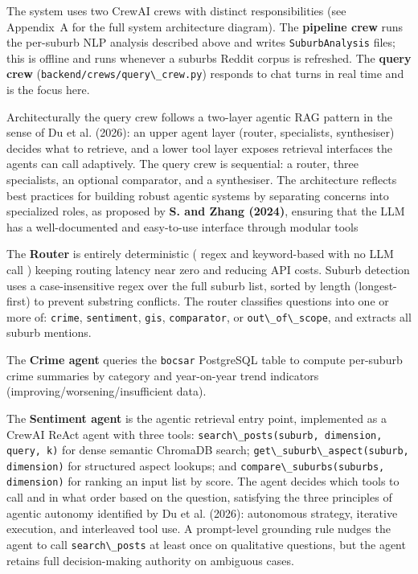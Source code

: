 \documentclass[11pt,a4paper]{article}
\newcommand{\passthrough}[1]{#1}
\begin{document}
The system uses two CrewAI crews with distinct responsibilities (see Appendix~A for the full system architecture diagram). The \textbf{pipeline crew} runs the per-suburb NLP analysis described above and writes \passthrough{\lstinline!SuburbAnalysis!} files; this is offline and runs whenever a suburb\textquotesingle s Reddit corpus is refreshed. The \textbf{query crew} (\passthrough{\lstinline!backend/crews/query\_crew.py!}) responds to chat turns in real time and is the focus here.

Architecturally the query crew follows a two-layer agentic RAG pattern in the sense of Du et al. (2026): an upper agent layer (router, specialists, synthesiser) decides what to retrieve, and a lower tool layer exposes retrieval interfaces the agents can call adaptively. The query crew is sequential: a router, three specialists, an optional comparator, and a synthesiser. The architecture reflects best practices for building robust agentic systems by separating concerns into specialized roles, as proposed by \textbf{S. and Zhang (2024)}, ensuring that the LLM has a well-documented and easy-to-use interface through modular tools

The \textbf{Router} is entirely deterministic ( regex and keyword-based with no LLM call ) keeping routing latency near zero and reducing API costs. Suburb detection uses a case-insensitive regex over the full suburb list, sorted by length (longest-first) to prevent substring conflicts. The router classifies questions into one or more of: \passthrough{\lstinline!crime!}, \passthrough{\lstinline!sentiment!}, \passthrough{\lstinline!gis!}, \passthrough{\lstinline!comparator!}, or \passthrough{\lstinline!out\_of\_scope!}, and extracts all suburb mentions.

The \textbf{Crime agent} queries the \passthrough{\lstinline!bocsar!} PostgreSQL table to compute per-suburb crime summaries by category and year-on-year trend indicators (improving/worsening/insufficient data).

The \textbf{Sentiment agent} is the agentic retrieval entry point, implemented as a CrewAI ReAct agent with three tools: \passthrough{\lstinline!search\_posts(suburb, dimension, query, k)!} for dense semantic ChromaDB search; \passthrough{\lstinline!get\_suburb\_aspect(suburb, dimension)!} for structured aspect lookups; and \passthrough{\lstinline!compare\_suburbs(suburbs, dimension)!} for ranking an input list by score. The agent decides which tools to call and in what order based on the question, satisfying the three principles of agentic autonomy identified by Du et al. (2026): autonomous strategy, iterative execution, and interleaved tool use. A prompt-level grounding rule nudges the agent to call \passthrough{\lstinline!search\_posts!} at least once on qualitative questions, but the agent retains full decision-making authority on ambiguous cases.
\end{document}
